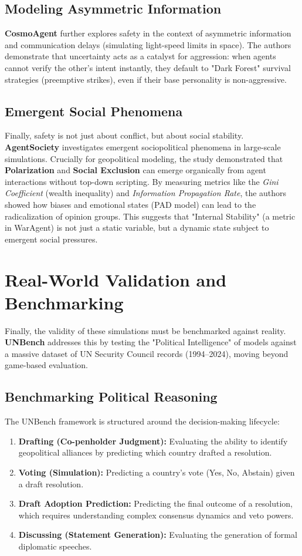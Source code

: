 \subsection{Modeling Asymmetric Information}
\textbf{CosmoAgent} further explores safety in the context of asymmetric information and communication delays (simulating light-speed limits in space). The authors demonstrate that uncertainty acts as a catalyst for aggression: when agents cannot verify the other's intent instantly, they default to "Dark Forest" survival strategies (preemptive strikes), even if their base personality is non-aggressive.
\subsection{Emergent Social Phenomena}
Finally, safety is not just about conflict, but about social stability. \textbf{AgentSociety} investigates emergent sociopolitical phenomena in large-scale simulations. Crucially for geopolitical modeling, the study demonstrated that \textbf{Polarization} and \textbf{Social Exclusion} can emerge organically from agent interactions without top-down scripting. By measuring metrics like the \textit{Gini Coefficient} (wealth inequality) and \textit{Information Propagation Rate}, the authors showed how biases and emotional states (PAD model) can lead to the radicalization of opinion groups. This suggests that "Internal Stability" (a metric in WarAgent) is not just a static variable, but a dynamic state subject to emergent social pressures.

\section{Real-World Validation and Benchmarking}
\label{sec:validation_unbench}

Finally, the validity of these simulations must be benchmarked against reality. \textbf{UNBench} \cite{liang2025benchmarking} addresses this by testing the "Political Intelligence" of models against a massive dataset of UN Security Council records (1994–2024), moving beyond game-based evaluation.

\subsection{Benchmarking Political Reasoning}
The UNBench framework is structured around the decision-making lifecycle:
\begin{enumerate}
    \item \textbf{Drafting (Co-penholder Judgment):} Evaluating the ability to identify geopolitical alliances by predicting which country drafted a resolution.
    \item \textbf{Voting (Simulation):} Predicting a country's vote (Yes, No, Abstain) given a draft resolution.
    \item \textbf{Draft Adoption Prediction:} Predicting the final outcome of a resolution, which requires understanding complex consensus dynamics and veto powers.
    \item \textbf{Discussing (Statement Generation):} Evaluating the generation of formal diplomatic speeches.
\end{enumerate}


